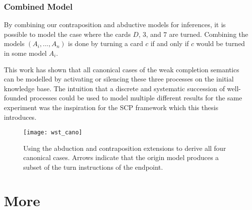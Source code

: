  
\subsubsection*{Combined Model}
By combining our contraposition and abductive models for inferences, it is possible to model the case where the cards $D$, $3$, and $7$ are turned. Combining the models $(A_i,...,A_n)$ is done by turning a card $c$ if and only if $c$ would be turned in some model $A_i$.

This work has shown that all canonical cases of the weak completion semantics can be modelled by activating or silencing these three processes on the initial knowledge base. The intuition that a discrete and systematic succession of well-founded processes could be used to model multiple different results for the same experiment was the inspiration for the SCP framework which this thesis introduces.


\begin{figure}
\centering \texttt{[image: wst\_cano]}
\caption{Using the abduction and contraposition extensions to derive all four canonical cases. Arrows indicate that the origin model produces a subset of the turn instructions of the endpoint.}
\label{fig:wstcano}
\end{figure}








\section{More}